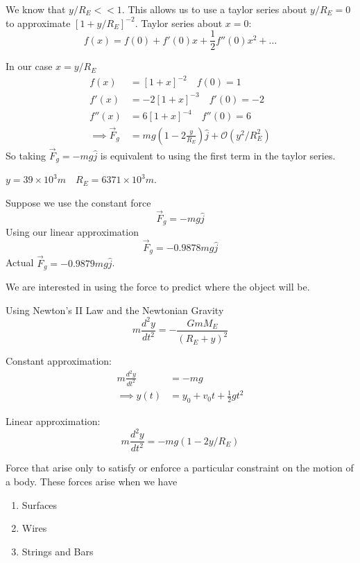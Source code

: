 \documentclass[10pt]{scrartcl}
\begin{document}
We know that $y/R_E << 1$. This allows us to use a taylor series about $y/R_E = 0$ to approximate $[1 + y/R_E]^{-2}$. Taylor series about $x = 0$:
\[f(x) = f(0) + f'(0)x + \textstyle{\frac{1}{2}f''(0)x^2 + \dots }\]

In our case $x = y/R_E$
\[
\begin{aligned}
f(x) &= [1+x]^{-2} \quad f(0) = 1\\
f'(x) &= -2[1+x]^{-3} \quad f'(0) = -2\\
f''(x) &= 6[1+x]^{-4} \quad f''(0) = 6\\
\implies \vec{F}_g &= mg(1-2\frac{y}{R_E})\hat{j} + \mathcal{O}(y^2/R^2_E)
\end{aligned}
\]
So taking $\vec{F}_g = -mg\hat{j}$ is equivalent to using the first term in the taylor series.\\

\begin{example} $y = 39 \times 10^3m \quad R_E = 6371 \times 10^3m$.

Suppose we use the constant force 
\[\vec{F}_g = -mg\hat{j}\]
Using our linear approximation 
\[\vec{F}_g = -0.9878mg\hat{j}\]
Actual $\vec{F}_g = -0.9879mg\hat{j}$. 
\end{example}

We are interested in using the force to predict where the object will be.

Using Newton's II Law and the Newtonian Gravity
\[m\frac{d^2y}{dt^2} = -\frac{GmM_E}{(R_E + y)^2}\]

Constant approximation:
\[\begin{aligned}m\frac{d^2y}{dt^2} &= -mg\\
\implies y(t) &= y_0 + v_0t + \frac{1}{2}gt^2	
\end{aligned}
\]

Linear approximation:
\[m\frac{d^2y}{dt^2} = -mg(1-2y/R_E)\]



Force  that arise only to satisfy or enforce a particular constraint on the motion of a body. These forces arise when we have 
\begin{enumerate}
\item Surfaces
\item Wires
\item Strings and Bars	
\end{enumerate}~
\end{document}
